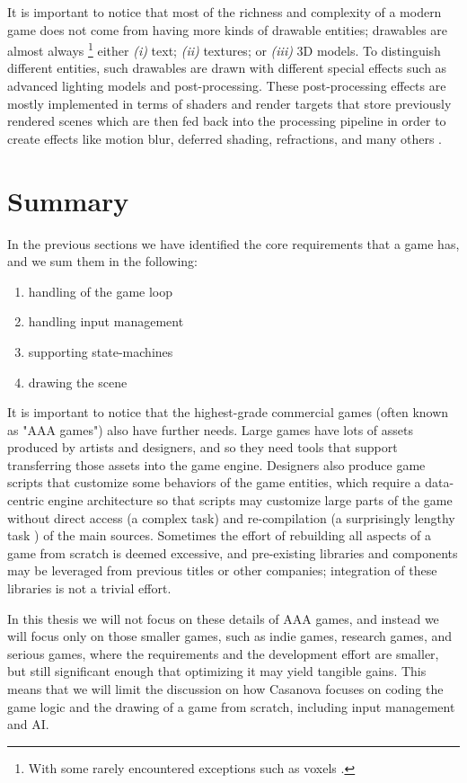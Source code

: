 It is important to notice that most of the richness and complexity of a modern game does not come from having more kinds of drawable entities; drawables are almost always \footnote{With some rarely encountered exceptions such as voxels \cite{CHAPTER_2_VOXELS,CHAPTER_2_VOXELS_IN_GAMES}.} either \textit{(i)} text; \textit{(ii)}  textures; or \textit{(iii)}  3D models. To distinguish different entities, such drawables are drawn with different special effects such as advanced lighting models and post-processing. These post-processing effects are mostly implemented in terms of shaders and render targets that store previously rendered scenes which are then fed back into the processing pipeline in order to create effects like motion blur, deferred shading, refractions, and many others \cite{GPU_GEMS_1, GPU_GEMS_2, GPU_GEMS_3}.

\section{Summary}
In the previous sections we have identified the core requirements that a game has, and we sum them in the following:

\begin{enumerate}
\item handling of the game loop
\item handling input management
\item supporting state-machines
\item drawing the scene
\end{enumerate}

It is important to notice that the highest-grade commercial games (often known as "AAA games") also have further needs. Large games have lots of assets produced by artists and designers, and so they need tools that support transferring those assets into the game engine. Designers also produce game scripts that customize some behaviors of the game entities, which require a data-centric engine architecture so that scripts may customize large parts of the game without direct access (a complex task) and re-compilation (a surprisingly lengthy task \cite{CHAPTER_2_COMPILATION_LENGTH}) of the main sources. Sometimes the effort of rebuilding all aspects of a game from scratch is deemed excessive, and pre-existing libraries and components may be leveraged from previous titles or other companies; integration of these libraries is not a trivial effort.

In this thesis we will not focus on these details of AAA games, and instead we will focus only on those smaller games, such as indie games, research games, and serious games, where the requirements and the development effort are smaller, but still significant enough that optimizing it may yield tangible gains. This means that we will limit the discussion on how Casanova focuses on coding the game logic and the drawing of a game from scratch, including input management and AI.